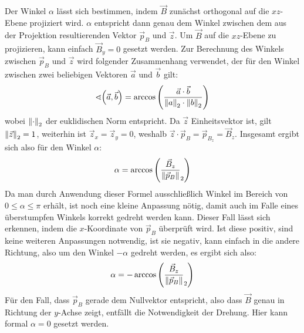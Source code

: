 Der Winkel \(\alpha\) l\"asst sich bestimmen, indem \(\vec{B}\) zun\"achst orthogonal auf die \(xz\)-Ebene projiziert wird. \(\alpha\)
entspricht dann genau dem Winkel zwischen dem aus der Projektion resultierenden Vektor \(\vec{p}_B\) und \(\vec{z}\).
Um \(\vec{B}\) auf die \(xz\)-Ebene zu projizieren, kann einfach \(\vec{B}_y=0\) gesetzt werden. Zur Berechnung des Winkels
zwischen \(\vec{p}_B\) und \(\vec{z}\)
wird folgender Zusammenhang verwendet, der f\"ur den Winkel zwischen zwei beliebigen Vektoren \(\vec{a}\) und \(\vec{b}\) gilt:
\begin{equation}
  \sphericalangle{\left(\vec{a},\vec{b}\right)} = \arccos{\left(\frac{\vec{a} \cdot \vec{b}}{\left\lVert a\right\rVert_2 \cdot \left\lVert b\right\rVert_2}\right)}
\end{equation}
wobei \(\left\lVert\cdot\right\rVert_2\) der euklidischen Norm entspricht. Da \(\vec{z}\) Einheitsvektor ist, gilt \(\left\lVert\vec{z}\right\rVert_2 = 1\),
weiterhin ist
\(\vec{z}_x = \vec{z}_y = 0\), weshalb \(\vec{z} \cdot \vec{p}_B = \vec{p}_{B_z} = \vec{B}_z\). Insgesamt ergibt sich also f\"ur den
Winkel \(\alpha\):
\begin{equation}
  \label{eq:alpha}
  \alpha = \arccos{\left(\frac{\vec{B}_z}{\left\lVert\vec{p}_B\right\rVert}_2\right)}
\end{equation}
Da man durch Anwendung dieser Formel ausschlie{\ss}lich Winkel im Bereich von \(0 \leq \alpha \leq \pi\) erh\"alt, ist noch eine kleine
Anpassung n\"otig, damit auch im Falle eines \"uberstumpfen Winkels korrekt gedreht werden kann. Dieser Fall l\"asst sich erkennen,
indem die \(x\)-Koordinate von \(\vec{p}_B\) \"uberpr\"uft wird. Ist diese positiv, sind keine weiteren Anpassungen notwendig,
ist sie negativ, kann einfach in die andere Richtung, also um den Winkel \(-\alpha\) gedreht werden, es ergibt sich also:
\begin{equation}
  \alpha = -\arccos{\left(\frac{\vec{B}_z}{\left\lVert\vec{p}_B\right\rVert}_2\right)}
\end{equation}
F\"ur den Fall, dass \(\vec{p}_B\)
gerade dem Nullvektor entspricht, also dass \(\vec{B}\) genau in Richtung der \(y\)-Achse zeigt, entf\"allt die Notwendigkeit
der Drehung. Hier kann formal \(\alpha = 0\) gesetzt werden.

